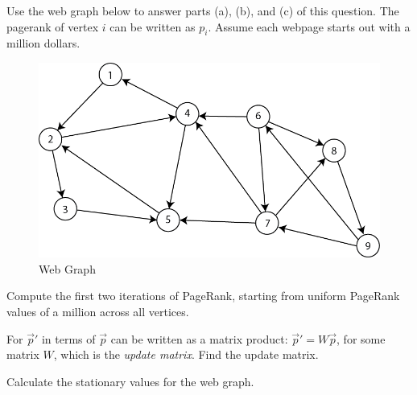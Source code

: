 \documentclass[12pt,twoside]{article}
\begin{document}
\begin{problem}{15} 
Use the web graph below to answer parts (a), (b), and (c) of this question. The pagerank of vertex $i$ can be written as $p_i$. Assume each webpage starts out with a million dollars.
\begin{figure}[h]
\begin{center}\includegraphics[width=12cm]{pagerank.png}\end{center}
\caption{Web Graph}
\end{figure}

\bparts

 Compute the first two iterations of PageRank, starting
from uniform PageRank values of a million across all vertices.
\solution{
}

 For $\vec{p}'$ in terms of $\vec{p}$ can be written as a matrix product: $\vec{p}' = W\vec{p}$, for some matrix $W$, which is the \emph{update matrix}. Find the update matrix.
\solution{
}

 Calculate the stationary values for the web graph.
\solution{
 }

\eparts
\end{problem}
\end{document}
